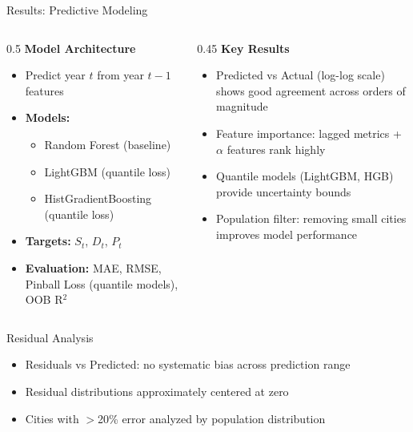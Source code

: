 \documentclass[10pt,aspectratio=169]{beamer}
\begin{document}
\begin{frame}{Results: Predictive Modeling}
\begin{columns}[T]
\begin{column}{0.5\textwidth}
\textbf{Model Architecture}
\begin{itemize}
    \item Predict year $t$ from year $t-1$ features
    \item \textbf{Models:}
    \begin{itemize}
        \item Random Forest (baseline)
        \item LightGBM (quantile loss)
        \item HistGradientBoosting (quantile loss)
    \end{itemize}
    \item \textbf{Targets:} $S_t$, $D_t$, $P_t$
    \item \textbf{Evaluation:} MAE, RMSE, Pinball Loss (quantile models), OOB R$^2$
\end{itemize}
\end{column}

\begin{column}{0.45\textwidth}
\textbf{Key Results}
\begin{itemize}
    \item Predicted vs Actual (log-log scale) shows good agreement across orders of magnitude
    \item Feature importance: lagged metrics + $\alpha$ features rank highly
    \item Quantile models (LightGBM, HGB) provide uncertainty bounds
    \item Population filter: removing small cities improves model performance
\end{itemize}
\end{column}
\end{columns}

\vspace{0.3cm}

\begin{block}{Residual Analysis}
\begin{itemize}
    \item Residuals vs Predicted: no systematic bias across prediction range
    \item Residual distributions approximately centered at zero
    \item Cities with $>$20\% error analyzed by population distribution
\end{itemize}
\end{block}
\end{frame}
\end{document}
